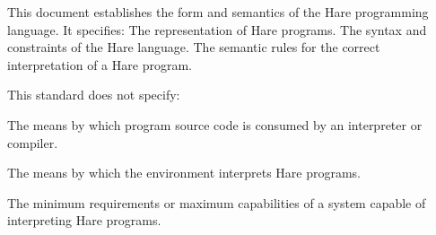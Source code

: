 
\specitem
This document establishes the form and semantics of the Hare programming
language. It specifies:
\specsubitem The representation of Hare programs.
\specsubitem The syntax and constraints of the Hare language.
\specsubitem The semantic rules for the correct interpretation of a Hare program.

\specitem
This standard does not specify:

\specsubitem
The means by which program source code is consumed by an interpreter or compiler.


\specsubitem The means by which the environment interprets Hare programs.

\specsubitem
The minimum requirements or maximum capabilities of a system capable of
interpreting Hare programs.
